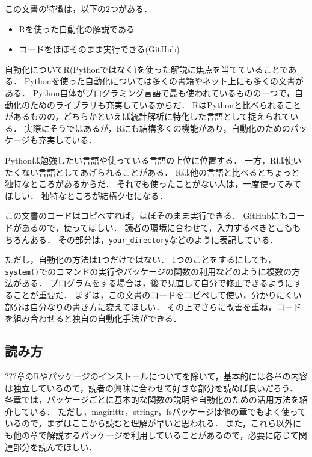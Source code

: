 \documentclass[
]{article}
\providecommand{\tightlist}{%
  \setlength{\itemsep}{0pt}\setlength{\parskip}{0pt}}
\begin{document}
この文書の特徴は，以下の2つがある．

\begin{itemize}
\tightlist
\item
  Rを使った自動化の解説である\\
\item
  コードをほぼそのまま実行できる(GitHub)
\end{itemize}

自動化についてR(Pythonではなく)を使った解説に焦点を当てていることである．
Pythonを使った自動化については多くの書籍やネット上にも多くの文書がある．
Python自体がプログラミング言語で最も使われているものの一つで，自動化のためのライブラリも充実しているからだ．
RはPythonと比べられることがあるものの，どちらかといえば統計解析に特化した言語として捉えられている．
実際にそうではあるが，Rにも結構多くの機能があり，自動化のためのパッケージも充実している．

Pythonは勉強したい言語や使っている言語の上位に位置する．
一方，Rは使いたくない言語としてあげられることがある．
Rは他の言語と比べるとちょっと独特なところがあるからだ．
それでも使ったことがない人は，一度使ってみてほしい．
独特なところが結構クセになる．

この文書のコードはコピペすれば，ほぼそのまま実行できる．
GitHubにもコードがあるので，使ってほしい．
読者の環境に合わせて，入力するべきとこももちろんある．
その部分は，\texttt{your\_directory}などのように表記している．

ただし，自動化の方法は1つだけではない．
1つのことをするにしても，\texttt{system()}でのコマンドの実行やパッケージの関数の利用などのように複数の方法がある．
プログラムをする場合は，後で見直して自分で修正できるようにすることが重要だ．
まずは，この文書のコードをコピペして使い，分かりにくい部分は自分なりの書き方に変えてほしい．
その上でさらに改善を重ね，コードを組み合わせると独自の自動化手法ができる．

\hypertarget{ux8aadux307fux65b9}{%
\subsection{読み方}\label{ux8aadux307fux65b9}}

???章のRやパッケージのインストールについてを除いて，基本的には各章の内容は独立しているので，読者の興味に合わせて好きな部分を読めば良いだろう．
各章では，パッケージごとに基本的な関数の説明や自動化のための活用方法を紹介している．
ただし，magirittr，stringr，fsパッケージは他の章でもよく使っているので，まずはここから読むと理解が早いと思われる．
また，これら以外にも他の章で解説するパッケージを利用していることがあるので，必要に応じて関連部分を読んでほしい．
\end{document}
